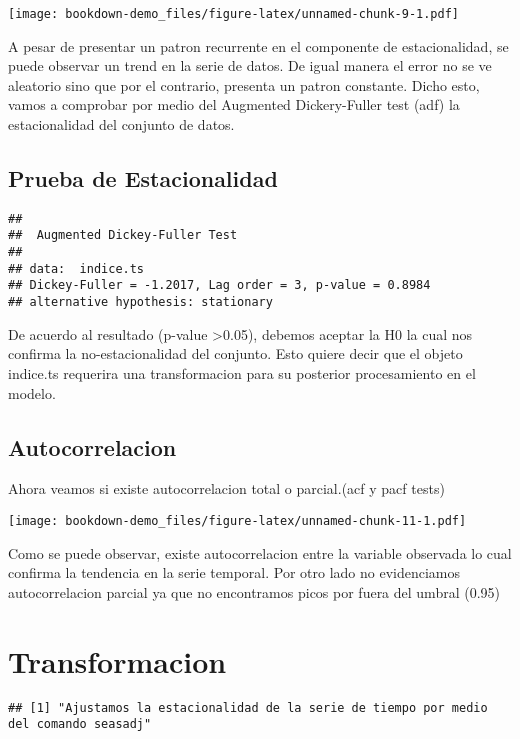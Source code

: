 \documentclass[
]{book}
\begin{document}
\texttt{[image: bookdown-demo\_files/figure-latex/unnamed-chunk-9-1.pdf]}

A pesar de presentar un patron recurrente en el componente de estacionalidad, se puede observar un trend en la serie de datos. De igual manera el error no se ve aleatorio sino que por el contrario, presenta un patron constante. Dicho esto, vamos a comprobar por medio del Augmented Dickery-Fuller test (adf) la estacionalidad del conjunto de datos.

\hypertarget{prueba-de-estacionalidad}{%
\subsection{Prueba de Estacionalidad}\label{prueba-de-estacionalidad}}

\begin{verbatim}
## 
##  Augmented Dickey-Fuller Test
## 
## data:  indice.ts
## Dickey-Fuller = -1.2017, Lag order = 3, p-value = 0.8984
## alternative hypothesis: stationary
\end{verbatim}

De acuerdo al resultado (p-value \textgreater0.05), debemos aceptar la H0 la cual nos confirma la no-estacionalidad del conjunto. Esto quiere decir que el objeto indice.ts requerira una transformacion para su posterior procesamiento en el modelo.

\hypertarget{autocorrelacion}{%
\subsection{Autocorrelacion}\label{autocorrelacion}}

Ahora veamos si existe autocorrelacion total o parcial.(acf y pacf tests)

\texttt{[image: bookdown-demo\_files/figure-latex/unnamed-chunk-11-1.pdf]}

Como se puede observar, existe autocorrelacion entre la variable observada lo cual confirma la tendencia en la serie temporal. Por otro lado no evidenciamos autocorrelacion parcial ya que no encontramos picos por fuera del umbral (0.95)

\hypertarget{transformacion}{%
\section{Transformacion}\label{transformacion}}

\begin{verbatim}
## [1] "Ajustamos la estacionalidad de la serie de tiempo por medio del comando seasadj"
\end{verbatim}
\end{document}
